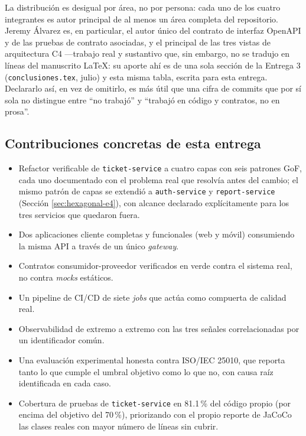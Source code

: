 La distribución es desigual por área, no por persona: cada uno de los cuatro integrantes es autor
principal de al menos un área completa del repositorio. Jeremy Álvarez es, en particular, el autor
único del contrato de interfaz OpenAPI y de las pruebas de contrato asociadas, y el principal de
las tres vistas de arquitectura C4 —trabajo real y sustantivo que, sin embargo, no se tradujo en
líneas del manuscrito LaTeX: su aporte ahí es de una sola sección de la Entrega 3
(\texttt{conclusiones.tex}, julio) y esta misma tabla, escrita para esta entrega. Declararlo así,
en vez de omitirlo, es más útil que una cifra de commits que por sí sola no distingue entre
``no trabajó'' y ``trabajó en código y contratos, no en prosa''.

\subsection{Contribuciones concretas de esta entrega}

\begin{itemize}[nosep]
  \item Refactor verificable de \texttt{ticket-service} a cuatro capas con seis patrones GoF,
        cada uno documentado con el problema real que resolvía antes del cambio; el mismo patrón
        de capas se extendió a \texttt{auth-service} y \texttt{report-service} (Sección
        \ref{sec:hexagonal-e4}), con alcance declarado explícitamente para los tres servicios que
        quedaron fuera.
  \item Dos aplicaciones cliente completas y funcionales (web y móvil) consumiendo la misma API a
        través de un único \emph{gateway}.
  \item Contratos consumidor-proveedor verificados en verde contra el sistema real, no contra
        \emph{mocks} estáticos.
  \item Un pipeline de CI/CD de siete \emph{jobs} que actúa como compuerta de calidad real.
  \item Observabilidad de extremo a extremo con las tres señales correlacionadas por un
        identificador común.
  \item Una evaluación experimental honesta contra ISO/IEC 25010, que reporta tanto lo que
        cumple el umbral objetivo como lo que no, con causa raíz identificada en cada caso.
  \item Cobertura de pruebas de \texttt{ticket-service} en 81.1\,\% del código propio (por
        encima del objetivo del 70\,\%), priorizando con el propio reporte de JaCoCo las clases
        reales con mayor número de líneas sin cubrir.
\end{itemize}


